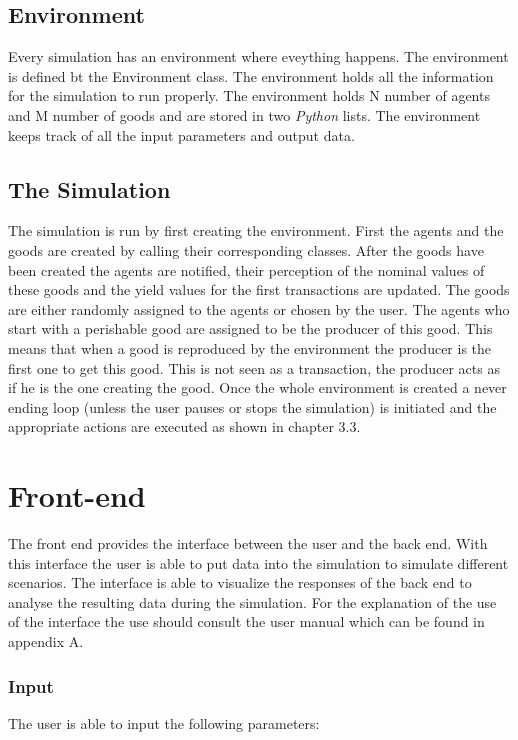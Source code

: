 \documentclass[twoside,openright]{uva-bachelor-thesis}
\begin{document}
\subsection{Environment}
Every simulation has an environment where eveything happens. The environment is defined bt the Environment class. The environment holds all the information for the simulation to run properly. The environment holds N number of agents and M number of goods and are stored in two \textit{Python} lists. The environment keeps track of all the input parameters and output data.

\subsection{The Simulation}
The simulation is run by first creating the environment. First the agents and the goods are created by calling their corresponding classes. After the goods have been created the agents are notified, their perception of the nominal values of these goods and the yield values for the first transactions are updated. The goods are either randomly assigned to the agents or chosen by the user. The agents who start with a perishable good are assigned to be the producer of this good. This means that when a good is reproduced by the environment the producer is the first one to get this good. This is not seen as a transaction, the producer acts as if he is the one creating the good. Once the whole environment is created a never ending loop (unless the user pauses or stops the simulation) is initiated and the appropriate actions are executed as shown in chapter 3.3.


\section{Front-end}
The front end provides the interface between the user and the back end. With this interface the user is able to put data into the simulation to simulate different scenarios. The interface is able to visualize the responses of the back end to analyse the resulting data during the simulation. For the explanation of the use of the interface the use should consult the user manual which can be found in appendix A.

\subsubsection{Input}
The user is able to input the following parameters:
\end{document}

